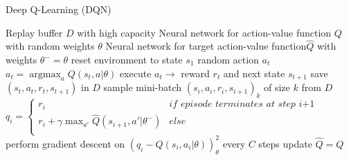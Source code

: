 \begin{algorithm}
	\caption{Deep Q-Learning (DQN)}\label{DQN-algo}
	\begin{algorithmic}
		\REQUIRE Replay buffer $\mathit{D}$ with high capacity
		\REQUIRE Neural network for action-value function $\mathit{Q}$
		with random weights $\theta$
		\REQUIRE Neural network for target action-value function$
		\mathit{\hat{Q}}$ with weights $\theta^-=\theta$
		\STATE reset environment to state $s_1$
		\STATE random action $a_t$
		\ELSE
		\STATE $a_t=\operatorname*{argmax}_a Q(s_t,a|\theta)$
		\ENDIF
		\STATE execute $a_t \rightarrow$ reward $r_t$ and next state 
		$s_{t+1}$
		\STATE save $(s_t, a_t, r_t,s_{t+1})$ in $D$
		\STATE sample mini-batch $(s_i, a_i, r_i,s_{i+1})_k$ of size $k$ from $D$
		\STATE $q_i =
			\begin{cases}
			r_i & \textit{if episode terminates at step i+1}\\
			r_i+\gamma \max_{a'}\hat{Q}(s_{i+1}, a'|\theta^{-})& 
			else\\			
			\end{cases}$
		\STATE perform gradient descent on $\left(q_i-Q\left(s_i, 
		a_i|\theta\right)\right)^2_\theta$
		\STATE every $C$ steps update $\hat{Q}=Q$
		\ENDFOR
		\ENDFOR
	\end{algorithmic}
\end{algorithm}


